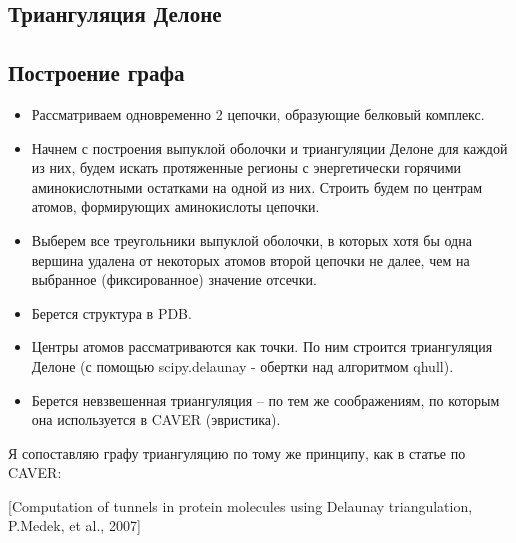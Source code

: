 \subsection{Триангуляция Делоне}
\subsection{Построение графа}
\begin{itemize}
\item Рассматриваем одновременно 2 цепочки, образующие белковый комплекс.
\item Начнем с построения выпуклой оболочки и триангуляции Делоне для каждой из них, будем искать протяженные регионы с энергетически горячими аминокислотными остатками  на одной из них. Строить будем по центрам атомов, формирующих аминокислоты цепочки.
\item Выберем все треугольники выпуклой оболочки, в которых хотя бы одна вершина удалена от некоторых атомов второй цепочки не далее, чем на выбранное (фиксированное) значение отсечки.
\end{itemize}


\begin{itemize}
\item Берется структура в PDB.
\item Центры атомов рассматриваются как точки. По ним строится триангуляция Делоне (с помощью scipy.delaunay - обертки над алгоритмом qhull).
\item Берется невзвешенная триангуляция -- по тем же соображениям, по которым она используется в CAVER (эвристика)\cite{caver2007}.
\end{itemize}
Я сопоставляю графу триангуляцию по тому же принципу, как в статье по CAVER:

\begin{center}

[Computation of tunnels in protein molecules using
Delaunay triangulation, P.Medek, et al., 2007]
\end{center}

